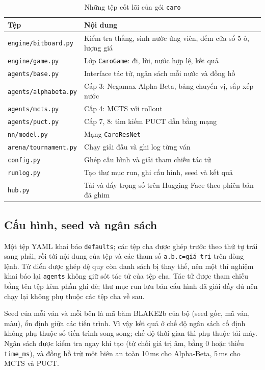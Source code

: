 \begin{table}[H]
  \centering\small
  \caption{Những tệp cốt lõi của gói \texttt{caro}}
  \label{tab:cs-tep-chinh}
  \begin{tabular}{lp{9.2cm}}
    \toprule
    Tệp & Nội dung\\
    \midrule
    \texttt{engine/bitboard.py} & Kiểm tra thắng, sinh nước ứng viên, đếm cửa sổ 5 ô, lượng giá\\
    \texttt{engine/game.py} & Lớp \texttt{CaroGame}: đi, lùi, nước hợp lệ, kết quả\\
    \texttt{agents/base.py} & Interface tác tử, ngân sách mỗi nước và đồng hồ\\
    \texttt{agents/alphabeta.py} & Cấp 3: Negamax Alpha-Beta, bảng chuyển vị, sắp xếp nước\\
    \texttt{agents/mcts.py} & Cấp 4: MCTS với rollout\\
    \texttt{agents/puct.py} & Cấp 7, 8: tìm kiếm PUCT dẫn bằng mạng\\
    \texttt{nn/model.py} & Mạng \texttt{CaroResNet}\\
    \texttt{arena/tournament.py} & Chạy giải đấu và ghi log từng ván\\
    \texttt{config.py} & Ghép cấu hình và giải tham chiếu tác tử\\
    \texttt{runlog.py} & Tạo thư mục run, ghi cấu hình, seed và kết quả\\
    \texttt{hub.py} & Tải và đẩy trọng số trên Hugging Face theo phiên bản đã ghim\\
    \bottomrule
  \end{tabular}
\end{table}

\subsection{Cấu hình, seed và ngân sách}
Một tệp YAML khai báo \texttt{defaults}; các tệp cha được ghép trước theo thứ tự trái sang phải, rồi tới nội dung của
tệp và các tham số \texttt{a.b.c=giá trị} trên dòng lệnh. Từ điển được ghép đệ quy còn danh sách bị thay thế, nên
một thí nghiệm khai báo lại \texttt{agents} không giữ sót tác tử của tệp cha. Tác tử được tham chiếu bằng tên tệp kèm
phần ghi đè; thư mục run lưu bản cấu hình đã giải đầy đủ nên chạy lại không phụ thuộc các tệp cha về sau.

Seed của mỗi ván và mỗi bên là mã băm BLAKE2b của bộ (seed gốc, mã ván, màu), ổn định giữa các tiến trình. Vì vậy kết
quả ở chế độ ngân sách cố định không phụ thuộc số tiến trình song song; chế độ thời gian thì phụ thuộc tải máy.
Ngân sách được kiểm tra ngay khi tạo (từ chối giá trị âm, bằng 0 hoặc thiếu \texttt{time\_ms}), và đồng hồ trừ một
biên an toàn 10\,ms cho Alpha-Beta, 5\,ms cho MCTS và PUCT.

